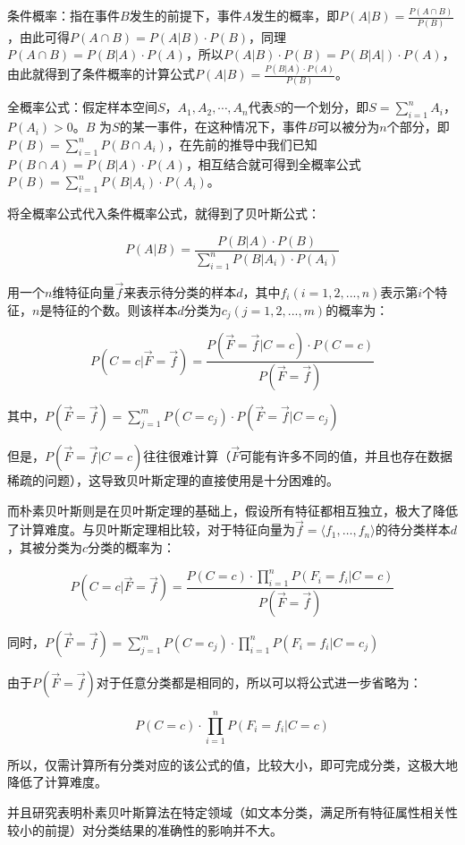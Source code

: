 \documentclass[UTF8,zihao=-4]{ctexart}
\begin{document}
	条件概率：指在事件$B$发生的前提下，事件$A$发生的概率，即$P(A|B)=\frac{P(A\cap B)}{P(B)}$，由此可得$P(A \cap B)=P(A|B) \cdot P(B)$，同理$P(A \cap B) = P(B|A) \cdot P(A)$，所以$P(A|B) \cdot P(B)=P(B|A|) \cdot P(A)$，由此就得到了条件概率的计算公式$P(A|B)=\frac{P(B|A) \cdot P(A)}{P(B)}$。
	
	全概率公式：假定样本空间$S$，$A_1,A_2,\cdots,A_n$代表$S$的一个划分，即$S=\sum\limits_{i=1}^{n}A_i$，$P(A_i)>0$。$B$ 为$S$的某一事件，在这种情况下，事件$B$可以被分为$n$个部分，即$P(B)=\sum\limits_{i=1}^{n}P(B\cap A_i)$，在先前的推导中我们已知$P(B \cap A)=P(B|A) \cdot P(A)$，相互结合就可得到全概率公式$P(B)=\sum\limits_{i=1}^{n}P(B|A_i) \cdot P(A_i)$。
	
	将全概率公式代入条件概率公式，就得到了贝叶斯公式：
	
	$$P(A|B) = \frac{P(B|A) \cdot P(B)}{\sum\limits_{i=1}^{n}P(B|A_i) \cdot P(A_i)}$$
	
	用一个$n$维特征向量$\vec{f}$来表示待分类的样本$d$，其中$f_i(i=1,2,...,n)$表示第$i$个特征，$n$是特征的个数。则该样本$d$分类为$c_j(j=1,2,...,m)$的概率为：
	
	$$P(C=c|\vec{F}=\vec{f})=\frac{P(\vec{F}=\vec{f}|C=c)\cdot P(C=c) } {P(\vec{F}=\vec{f})}$$
	
	其中，$P(\vec{F}=\vec{f})=\sum\limits_{j=1}^{m} P(C=c_j) \cdot P(\vec{F}=\vec{f}|C=c_j)$
	
	但是，$P(\vec{F}=\vec{f}|C=c)$往往很难计算（$\vec{F}$可能有许多不同的值，并且也存在数据稀疏的问题），这导致贝叶斯定理的直接使用是十分困难的。
	
	而朴素贝叶斯则是在贝叶斯定理的基础上，假设所有特征都相互独立，极大了降低了计算难度。与贝叶斯定理相比较，对于特征向量为$\vec{f}=\langle f_1, \ldots, f_n \rangle$的待分类样本$d$，其被分类为$c$分类的概率为：
	
	$$P(C=c|\vec{F}=\vec{f})=\frac{P(C=c) \cdot \prod\limits_{i=1}^{n} P(F_i=f_i|C=c)} {P(\vec{F}=\vec{f})}$$
		
	同时，$P(\vec{F}=\vec{f})=\sum\limits_{j=1}^{m} P(C=c_j) \cdot \prod\limits_{i=1}^{n}  P(F_i=f_i|C=c_j)$
	
	由于$P(\vec{F}=\vec{f})$对于任意分类都是相同的，所以可以将公式进一步省略为：
	
	$$P(C=c) \cdot \prod\limits_{i=1}^{n} P(F_i=f_i|C=c)$$
	
	所以，仅需计算所有分类对应的该公式的值，比较大小，即可完成分类，这极大地降低了计算难度。
	
	并且研究表明朴素贝叶斯算法在特定领域（如文本分类，满足所有特征属性相关性较小的前提）对分类结果的准确性的影响并不大。
\end{document}
